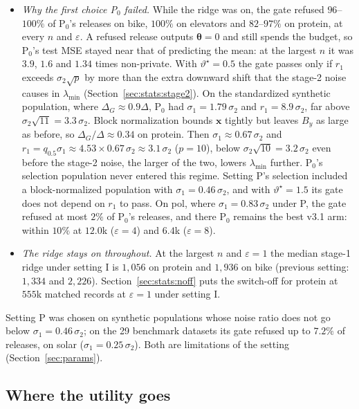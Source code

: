 \documentclass[11pt]{article}
\theoremstyle{definition}
\theoremstyle{plain}
\newcommand{\bx}{\mathbf{x}}
\newcommand{\btheta}{\boldsymbol{\theta}}
\begin{document}
\begin{itemize}
  \item \emph{Why the first choice P$_0$ failed.} While the ridge was on, the gate refused $96$--$100\%$ of P$_0$'s releases on bike, $100\%$ on elevators and $82$--$97\%$ on protein, at every $n$ and $\varepsilon$. A refused release outputs $\btheta = 0$ and still spends the budget, so P$_0$'s test MSE stayed near that of predicting the mean: at the largest $n$ it was $3.9$, $1.6$ and $1.34$ times non-private. With $\vartheta^\star = 0.5$ the gate passes only if $r_1$ exceeds $\sigma_2\sqrt p$ by more than the extra downward shift that the stage-2 noise causes in $\lambda_{\min}$ (Section~\ref{sec:stats:stage2}). On the standardized synthetic population, where $\Delta_G \approx 0.9\Delta$, P$_0$ had $\sigma_1 = 1.79\,\sigma_2$ and $r_1 = 8.9\,\sigma_2$, far above $\sigma_2\sqrt{11} = 3.3\,\sigma_2$. Block normalization bounds $\bx$ tightly but leaves $B_y$ as large as before, so $\Delta_G/\Delta \approx 0.34$ on protein. Then $\sigma_1 \approx 0.67\,\sigma_2$ and $r_1 = q_{0.5}\sigma_1 \approx 4.53 \times 0.67\,\sigma_2 \approx 3.1\,\sigma_2$ ($p = 10$), below $\sigma_2\sqrt{10} = 3.2\,\sigma_2$ even before the stage-2 noise, the larger of the two, lowers $\lambda_{\min}$ further. P$_0$'s selection population never entered this regime. Setting P's selection included a block-normalized population with $\sigma_1 = 0.46\,\sigma_2$, and with $\vartheta^\star = 1.5$ its gate does not depend on $r_1$ to pass. On pol, where $\sigma_1 = 0.83\,\sigma_2$ under P, the gate refused at most $2\%$ of P$_0$'s releases, and there P$_0$ remains the best v3.1 arm: within $10\%$ at $12.0$k ($\varepsilon = 4$) and $6.4$k ($\varepsilon = 8$).
  \item \emph{The ridge stays on throughout.} At the largest $n$ and $\varepsilon = 1$ the median stage-1 ridge under setting I is $1{,}056$ on protein and $1{,}936$ on bike (previous setting: $1{,}334$ and $2{,}226$). Section~\ref{sec:stats:noff} puts the switch-off for protein at $555$k matched records at $\varepsilon = 1$ under setting I.
\end{itemize}

Setting P was chosen on synthetic populations whose noise ratio does not go below $\sigma_1 = 0.46\,\sigma_2$; on the 29 benchmark datasets its gate refused up to $7.2\%$ of releases, on solar ($\sigma_1 = 0.25\,\sigma_2$). Both are limitations of the setting (Section~\ref{sec:params}).

\subsection{Where the utility goes}
\label{sec:eval:lessons}
\end{document}

